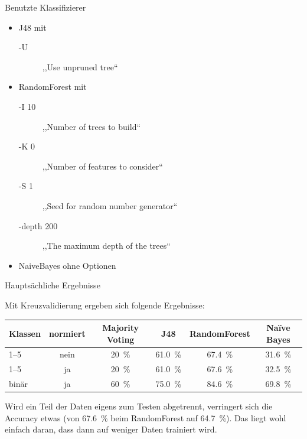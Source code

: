 \documentclass[note=hide]{beamer} %
\begin{document}
\begin{frame}{Benutzte Klassifizierer}
	\begin{itemize}
		\item J48 mit 
			\begin{description}
				\item[-U] ,,Use unpruned tree``
			\end{description}
		\item RandomForest mit 
			\begin{description}
				\item[-I 10] ,,Number of trees to build``
				\item[-K 0] ,,Number of features to consider``
				\item[-S 1] ,,Seed for random number generator``
				\item[-depth 200] ,,The maximum depth of the trees``
			\end{description}
		\item NaiveBayes ohne Optionen
	\end{itemize}
\end{frame}

\begin{frame}{Hauptsächliche Ergebnisse}

	Mit Kreuzvalidierung ergeben sich folgende Ergebnisse:

	{
		\begin{tabular}{lccccc}
			\toprule
			Klassen & normiert & Majority Voting & J48 & RandomForest & Naïve Bayes \\
			\midrule
			1--5 & nein & \SI{20}{\%} &\SI{61.0}{\%} & \SI{67.4}{\%} & \SI{31.6}{\%} \\
			1--5 & ja & \SI{20}{\%} &\SI{61.0}{\%} & \alert{\SI{67.6}{\%}} & \SI{32.5}{\%} \\
			binär & ja & \SI{60}{\%} & \SI{75.0}{\%} & \SI{84.6}{\%} & \SI{69.8}{\%} \\
			\bottomrule
		\end{tabular}
	}
	Wird ein Teil der Daten eigens zum Testen abgetrennt, verringert sich die Accuracy etwas (von \SI{67.6}{\%} beim RandomForest auf \SI{64.7}{\%}).
	Das liegt wohl einfach daran, dass dann auf weniger Daten trainiert wird.
	
\end{frame}
\end{document}
